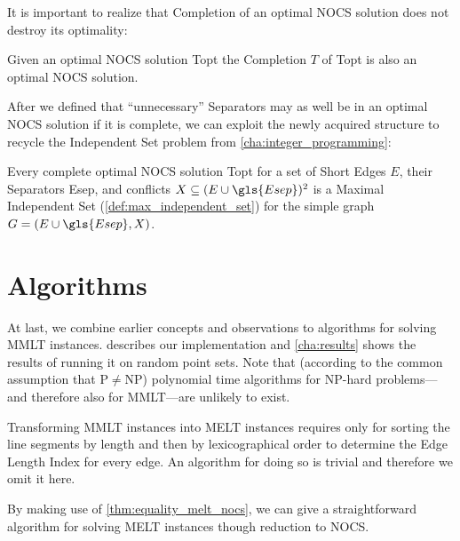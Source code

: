 It is important to realize that Completion of an optimal \gls{NOCS}
solution does not destroy its optimality:

\begin{theorem}
  Given an optimal \gls{NOCS} solution \gls{Topt}
  the Completion \(T\) of \gls{Topt}
  is also an optimal \gls{NOCS} solution.
\end{theorem}

After we defined that ``unnecessary'' Separators may as well be in
an optimal \gls{NOCS} solution if it is complete, we can exploit the
newly acquired structure to recycle the Independent Set problem from
\cref{cha:integer_programming}:

\begin{theorem}
  Every complete optimal \gls{NOCS} solution \gls{Topt}
  for a set of Short Edges \(E\), their Separators \gls{Esep},
  and conflicts \(X \subseteq (E \cup \gls{Esep})^2\)
  is a Maximal Independent Set (\cref{def:max_independent_set})
  for the simple graph \(G = (E \cup \gls{Esep}, X)\).
\end{theorem}

\section{Algorithms}
At last, we combine earlier concepts and observations to algorithms
for solving \gls{MMLT} instances.  describes
our implementation and \cref{cha:results} shows the results of running
it on random point sets. Note that (according to the common assumption
that P\(\not=\)NP) polynomial time algorithms for NP-hard
problems---and therefore also for \gls{MMLT}---are unlikely to exist.

Transforming \gls{MMLT} instances into \gls{MELT} instances requires
only for sorting the line segments by length and then by
lexicographical order to determine the Edge Length Index for every
edge. An algorithm for doing so is trivial and therefore we omit it
here.

By making use of \cref{thm:equality_melt_nocs}, we can give a
straightforward algorithm for solving \gls{MELT} instances though
reduction to \gls{NOCS}.

